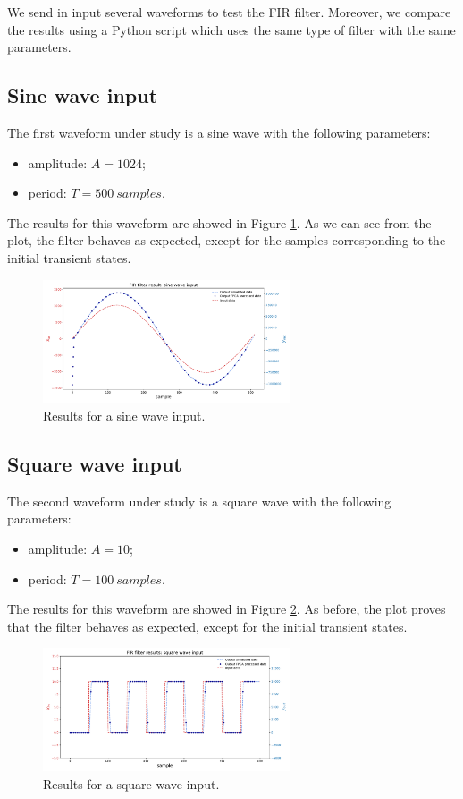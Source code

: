 \documentclass[11pt, a4paper]{article}
\begin{document}
We send in input several waveforms to test the FIR filter. Moreover, we compare the results using a Python script which uses the same type of filter with the same parameters. 

\subsection{Sine wave input}
The first waveform under study is a sine wave with the following parameters:
\begin{itemize}
    \item amplitude: $A = 1024$;
    \item period: $T = 500 \ \si{samples}$.
\end{itemize}
The results for this waveform are showed in Figure \ref{fig:sine_wave}. As we can see from the plot, the filter behaves as expected, except for the samples corresponding to the initial transient states.
\begin{figure}[h!]
    \centering
    \includegraphics[width=0.65\textwidth]{../images/behavioural/sine.pdf}
    \caption{Results for a sine wave input.}
    \label{fig:sine_wave}
\end{figure}

\subsection{Square wave input}
The second waveform under study is a square wave with the following parameters:
\begin{itemize}
    \item amplitude: $A = 10$;
    \item period: $T = 100 \ \si{samples}$.
\end{itemize}
The results for this waveform are showed in Figure \ref{fig:square_wave}. As before, the plot proves that the filter behaves as expected, except for the initial transient states.

\begin{figure}[h!]
    \centering
    \includegraphics[width=0.65\textwidth]{../images/behavioural/square.pdf}
    \caption{Results for a square wave input.}
    \label{fig:square_wave}
\end{figure}
\end{document}
